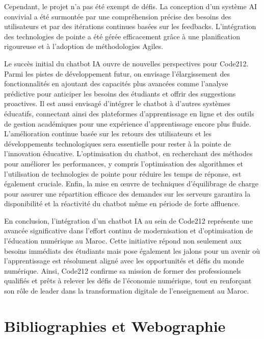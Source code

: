 \documentclass[a4paper, 11pt, openany]{report}
\begin{document}
Cependant, le projet n'a pas été exempt de défis. La conception d'un système AI convivial a été surmontée par une compréhension précise des besoins des utilisateurs et par des itérations continues basées sur les feedbacks. L'intégration des technologies de pointe a été gérée efficacement grâce à une planification rigoureuse et à l'adoption de méthodologies Agiles.
\newline

Le succès initial du chatbot IA ouvre de nouvelles perspectives pour Code212. Parmi les pistes de développement futur, on envisage l'élargissement des fonctionnalités en ajoutant des capacités plus avancées comme l'analyse prédictive pour anticiper les besoins des étudiants et offrir des suggestions proactives. Il est aussi envisagé d'intégrer le chatbot à d'autres systèmes éducatifs, connectant ainsi des plateformes d'apprentissage en ligne et des outils de gestion académiques pour une expérience d'apprentissage encore plus fluide. L'amélioration continue basée sur les retours des utilisateurs et les développements technologiques sera essentielle pour rester à la pointe de l'innovation éducative. L'optimisation du chatbot, en recherchant des méthodes pour améliorer les performances, y compris l'optimisation des algorithmes et l'utilisation de technologies de pointe pour réduire les temps de réponse, est également cruciale. Enfin, la mise en œuvre de techniques d'équilibrage de charge pour assurer une répartition efficace des demandes sur les serveurs garantira la disponibilité et la réactivité du chatbot même en période de forte affluence.
\newline

En conclusion, l'intégration d'un chatbot IA au sein de Code212 représente une avancée significative dans l'effort continu de modernisation et d'optimisation de l'éducation numérique au Maroc. Cette initiative répond non seulement aux besoins immédiats des étudiants mais pose également les jalons pour un avenir où l'apprentissage est résolument aligné avec les opportunités et défis du monde numérique. Ainsi, Code212 confirme sa mission de former des professionnels qualifiés et prêts à relever les défis de l'économie numérique, tout en renforçant son rôle de leader dans la transformation digitale de l'enseignement au Maroc.



\chapter*{Bibliographies et Webographie}
\end{document}
